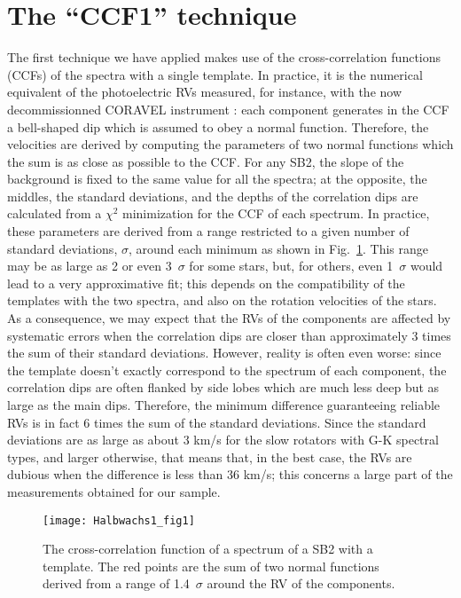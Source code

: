 \documentclass{sf2a-conf2017}
\begin{document}
  

\section{The ``CCF1'' technique}
The first technique we have applied makes use of the cross-correlation functions (CCFs) of the spectra with a single template. 
In practice, it is the numerical equivalent of the photoelectric RVs measured, for instance, with the now decommissionned
CORAVEL instrument \citep{Baranne79}: each component generates in the CCF a bell-shaped dip which is assumed to obey a
normal function. Therefore, the velocities are derived by computing the parameters of two normal functions which the sum
is as close as possible to the CCF. For any SB2, the slope of the background is fixed to the same value for all the spectra;
at the opposite, the middles, the standard deviations, and the depths of the correlation dips are calculated from a $\chi^2$ 
minimization for the CCF of each spectrum. 
In practice, these parameters are derived from a range
restricted to a given number of standard deviations, $\sigma$, around each minimum as shown in Fig.~\ref{Halbwachs1:fig1}. This range
may be as large as 2 or even 3~$\sigma$ for some stars, but, for others, even 1~$\sigma$ would lead to a very approximative fit;
this depends on the compatibility of the templates with the two spectra, and also on the rotation velocities of the stars.
As a consequence, we may expect that the RVs of the components are affected by systematic errors when the correlation dips
are closer than approximately 3 times the sum of their standard deviations. However, reality is often even worse: since
the template doesn't exactly correspond to the spectrum of each component, the correlation dips are often flanked by side lobes
which are much less deep but as large as the main dips. Therefore, the minimum difference guaranteeing reliable RVs
is in fact 6 times the sum of the standard deviations.
Since the standard deviations are as large as about 3 km/s
for the slow rotators with G-K spectral types, and larger otherwise, that means that, in the best case, the RVs are dubious when the difference
is less than 36 km/s; this concerns a large part of the measurements obtained for our sample.

\begin{figure}[ht!]
 \centering
 \texttt{[image: Halbwachs1\_fig1]}      
  \caption{The cross-correlation function of a spectrum of a SB2 with a template. The red points are the sum of two
normal functions derived from a range of 1.4~$\sigma$ around  the RV of the components.}
  \label{Halbwachs1:fig1}
\end{figure}
\end{document}
